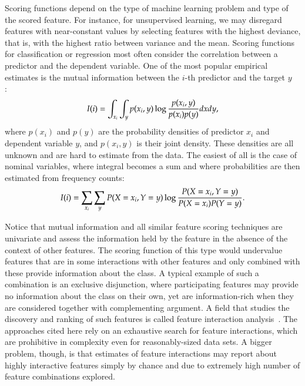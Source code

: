 \begin{refsection}
Scoring functions depend on the type of machine learning problem and type of the scored feature. For instance, for unsupervised learning, we may disregard features with near-constant values by selecting features with the highest deviance, that is, with the highest ratio between variance and the mean. Scoring functions for classification or regression most often consider the correlation between a predictor and the dependent variable. One of the most popular empirical estimates is the mutual information between the $i$-th predictor and the target $y$ ~\citep{Guyon2003} :
$$
I(i)=\int_{x_i}\int_y p(x_i,y)\log{p(x_i,y)\over p(x_i)p(y)}dx dy,
$$
where $p(x_i)$ and $p(y)$ are the probability densities of predictor $x_i$ and dependent variable $y$, and $p(x_i,y)$ is their joint density. These densities are all unknown and are hard to estimate from the data. The easiest of all is the case of nominal variables, where integral becomes a sum and where probabilities are then estimated from frequency counts:
$$
I(i) = \sum_{x_i}\sum_{y} P(X=x_i, Y=y)\log {P(X=x_i,Y=y)\over P(X=x_i) P(Y=y)}.
$$

Notice that mutual information and all similar feature scoring techniques are univariate and assess the information held by the feature in the absence of the context of other features. The scoring function of this type would undervalue features that are in some interactions with other features and only combined with these provide information about the class. A typical example of such a combination is an exclusive disjunction, where participating features may provide no information about the class on their own, yet are information-rich when they are considered together with complementing argument. A field that studies the discovery and ranking of such features is called feature interaction analysis~\citep{Jakulin2005,Anastassiou2007}. The approaches cited here rely on an exhaustive search for feature interactions, which are prohibitive in complexity even for reasonably-sized data sets. A bigger problem, though, is that estimates of feature interactions may report about highly interactive features simply by chance and due to extremely high number of feature combinations explored.


\end{refsection}
